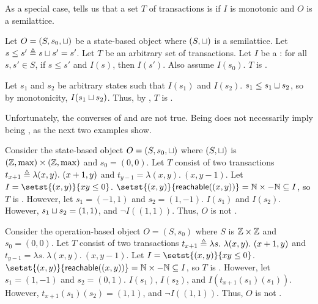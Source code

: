 As a special case,  tells us that a set $T$ of
transactions is \Iconfluent{} if $I$ is monotonic and $O$ is a semilattice.

\begin{claim}
  Let $O = (S, s_0, \sqcup)$ be a state-based object where $(S, \sqcup)$ is a
  semilattice. Let $s \leq s' \triangleq s \sqcup s' = s'$. Let $T$ be an arbitrary
  set of transactions. Let $I$ be a : for all $s, s'\in S$,
  if $s \leq s'$ and $I(s)$, then $I(s')$. Also assume $I(s_0)$. $T$ is
  \Iconfluent{}.
\end{claim}
\begin{elidableproof}
  Let $s_1$ and $s_2$ be arbitrary states such that $I(s_1)$ and $I(s_2)$. $s_1
  \leq s_1 \sqcup s_2$, so by monotonicity, $I(s_1 \sqcup s_2)$. Thus, by
  , $T$ is \Iconfluent{}.
\end{elidableproof}

Unfortunately, the converses of  and
 are not true. Being \Iconfluent{} does not
necessarily imply being \Iclosed{}, as the next two examples show.

\begin{example}
  Consider the state-based object $O = (S, s_0, \sqcup)$ where $(S, \sqcup)$ is
  $(\mathbb{Z}, \max) \times (\mathbb{Z}, \max)$ and $s_0 = (0, 0)$. Let $T$ consist of
  two transactions $t_{x+1} \triangleq \lambda (x, y).\ (x + 1, y)$ and $t_{y-1} =
  \lambda (x, y).\ (x, y - 1)$. Let $I = \setst{(x, y)}{xy \leq 0}$.
  $\setst{(x, y)}{\reachable{(x, y)}} = \nats \times -\nats \subseteq I$, so
  $T$ is \Iconfluent. However, let $s_1 = (-1, 1)$ and $s_2 = (1, -1)$.
  $I(s_1)$ and $I(s_2)$. However, $s_1 \sqcup s_2 = (1, 1)$, and $\lnot I((1,
  1))$. Thus, $O$ is not \Iclosed{}.
\end{example}

\begin{example}
  Consider the operation-based object $O = (S, s_0)$ where $S$ is $\mathbb{Z} \times
  \mathbb{Z}$ and $s_0 = (0, 0)$. Let $T$ consist of two transactions $t_{x+1}
  \triangleq \lambda s.\ \lambda (x, y).\ (x + 1, y)$ and $t_{y-1} = \lambda s.\
  \lambda (x, y).\ (x, y - 1)$. Let $I = \setst{(x, y)}{xy \leq 0}$.
  $\setst{(x, y)}{\reachable{(x, y)}} = \nats \times -\nats \subseteq I$, so
  $T$ is \Iconfluent. However, let $s_1 = (1, -1)$ and $s_2 = (0, 1)$.
  $I(s_1)$, $I(s_2)$, and $I(t_{x+1}(s_1)(s_1))$. However, $t_{x+1}(s_1)(s_2) =
  (1, 1)$, and $\lnot I((1, 1))$. Thus, $O$ is not \Iclosed{}.
\end{example}

